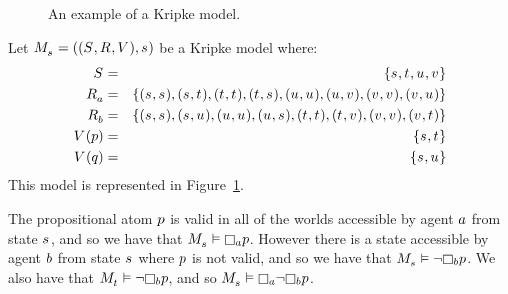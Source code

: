 \begin{example}
\begin{figure}
    \caption{An example of a Kripke model.}\label{example-kripke-model}
    \centering
\end{figure}

Let $\kPModelAndTuple{\kStateS}$ be a Kripke model where:
\begin{eqnarray*}
    \kStates &=& \{\kStateS, \kStateT, \kStateU, \kStateV\}\\
    \kAccessibilityA &=& \{(\kStateS, \kStateS), (\kStateS, \kStateT), (\kStateT, \kStateT), (\kStateT, \kStateS),
                           (\kStateU, \kStateU), (\kStateU, \kStateV), (\kStateV, \kStateV), (\kStateV, \kStateU)\}\\
    \kAccessibilityB &=& \{(\kStateS, \kStateS), (\kStateS, \kStateU), (\kStateU, \kStateU), (\kStateU, \kStateS),
                           (\kStateT, \kStateT), (\kStateT, \kStateV), (\kStateV, \kStateV), (\kStateV, \kStateT)\}\\
    \kValuation(\atomP) &=& \{\kStateS, \kStateT\}\\
    \kValuation(\atomQ) &=& \{\kStateS, \kStateU\}
\end{eqnarray*}
This model is represented in Figure~\ref{example-kripke-model}.

The propositional atom $p$ is valid in all of the worlds accessible by agent $a$ from state $\kStateS$, and so we have that $\kPModel{\kStateS} \entails \knowsA \atomP$.
However there is a state accessible by agent $b$ from state $\kStateS$ where $p$ is not valid, and so we have that $\kPModel{\kStateS} \entails \lnot \knowsB \atomP$.
We also have that $\kPModel{\kStateT} \entails \lnot \knowsB \atomP$, and so $\kPModel{\kStateS} \entails \knowsA \lnot \knowsB \atomP$.
\end{example}

